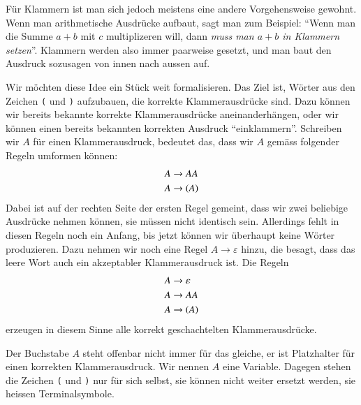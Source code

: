 %
Für Klammern ist man sich jedoch meistens eine andere Vorgehensweise
gewohnt. Wenn man arithmetische Ausdrücke aufbaut, sagt man zum
Beispiel: ``Wenn man die Summe $a+b$ mit $c$ multiplizeren will,
dann {\em muss man $a+b$ in Klammern setzen}''.
Klammern werden also immer paarweise gesetzt, und man baut den
Ausdruck sozusagen von innen nach aussen auf.

Wir möchten diese Idee ein Stück weit formalisieren. Das Ziel ist,
Wörter aus den Zeichen {\tt (} und {\tt )} aufzubauen, die korrekte
Klammerausdrücke sind. Dazu können wir bereits bekannte korrekte
Klammerausdrücke aneinanderhängen, oder wir können einen bereits
bekannten korrekten Ausdruck ``einklammern''. Schreiben wir $A$
für einen Klammerausdruck, bedeutet das, dass wir $A$ gemäss
folgender Regeln umformen können:
\begin{align*}
A&\to AA\\
A&\to {\tt (}A{\tt )}
\end{align*}
Dabei ist auf der rechten Seite der ersten Regel gemeint, dass wir zwei beliebige
Ausdrücke nehmen können, sie müssen nicht identisch sein. Allerdings
fehlt in diesen Regeln noch ein Anfang, bis jetzt können wir überhaupt
keine Wörter produzieren. Dazu nehmen wir noch eine Regel $A\to\varepsilon$
hinzu, die besagt, dass das leere Wort auch ein akzeptabler
Klammerausdruck ist. Die Regeln
\begin{align}
A&\to\varepsilon       \label{regeln-beispiel-1}\\
A&\to AA               \label{regeln-beispiel-2}\\
A&\to {\tt (}A{\tt )}  \label{regeln-beispiel-3}
\end{align}
erzeugen in diesem Sinne alle korrekt geschachtelten Klammerausdrücke.

Der Buchstabe $A$ steht offenbar nicht immer für das gleiche, 
er ist Platzhalter für einen korrekten Klammerausdruck. Wir nennen
$A$ eine Variable.
Dagegen stehen die Zeichen {\tt (} und {\tt )} nur für sich selbst, sie
können nicht weiter ersetzt werden, sie heissen Terminalsymbole.

